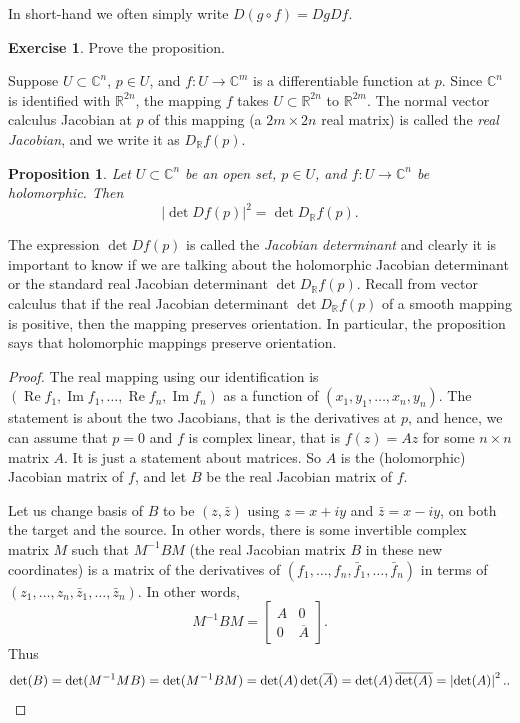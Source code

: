 \documentclass[12pt,openany]{book}
\renewcommand{\Re}{\operatorname{Re}}
\renewcommand{\Im}{\operatorname{Im}}
\newcommand{\abs}[1]{\left\lvert {#1} \right\rvert}
\newcommand{\C}{{\mathbb{C}}}
\newcommand{\R}{{\mathbb{R}}}
\newcommand{\myindex}[1]{#1\index{#1}}
\theoremstyle{plain}
\newtheorem{prop}[thm]{Proposition}
\theoremstyle{remark}
\theoremstyle{definition}
\newenvironment{exbox}{%
    \def\FrameCommand{\vrule width 1pt \relax\hspace {10pt}}%
    \MakeFramed {\advance \hsize -\width \FrameRestore }%
}{%
    \endMakeFramed
}
\theoremstyle{exercise}
\newtheorem{exercise}{Exercise}[section]
\theoremstyle{example}
\begin{document}
In short-hand we often simply write $D(g \circ f) = Dg Df$.

\begin{exbox}
\begin{exercise}
Prove the proposition.
\end{exercise}
\end{exbox}

Suppose $U \subset \C^n$, $p \in U$, and $f \colon U \to \C^m$
is a differentiable function at $p$.
Since $\C^n$ is identified with $\R^{2n}$, the mapping $f$
takes $U \subset \R^{2n}$ to $\R^{2m}$.  The normal vector calculus Jacobian at $p$
of this mapping (a $2m \times 2n$ real matrix) is called the
\emph{\myindex{real Jacobian}}, and we write it as
%
$D_\R f (p)$.

\begin{prop}
Let $U \subset \C^n$ be an open set, $p \in U$, and 
$f \colon U \to \C^n$ be holomorphic.  Then
\begin{equation*}
\abs{\det D f(p) }^2 = 
\det D_\R f(p) .
\end{equation*}
\end{prop}

The expression $\det D f(p)$ is called the \emph{\myindex{Jacobian
determinant}} and clearly it is important to know if we are talking about
the holomorphic Jacobian determinant or the standard real Jacobian
determinant $\det D_\R f(p)$.  Recall from vector calculus that
if the real Jacobian determinant $\det D_\R
f(p)$ of a smooth mapping is positive, then the mapping preserves
orientation.  In particular, the proposition
says that holomorphic mappings preserve orientation.

\begin{proof}
The real mapping using our identification is
$(\Re f_1,\Im f_1, \ldots, \Re f_n, \Im f_n)$
as a function of $(x_1,y_1,\ldots,x_n,y_n)$.
The statement is about the two Jacobians, that is the derivatives
at $p$, and hence, we can assume that
$p=0$ and $f$ is complex linear, that is $f(z) = Az$ for some $n \times n$
matrix $A$.  It is just a statement about matrices.
So $A$ is the (holomorphic) Jacobian matrix of $f$, and
let $B$ be the real Jacobian matrix of $f$.

Let us change basis of $B$ to be $(z,\bar{z})$
using $z = x+iy$ and $\bar{z}=x-iy$,
on both the target and the source.
In other words, there is some invertible
complex matrix $M$ such that
$M^{-1} B M$ (the real Jacobian matrix $B$ in these new coordinates)
is a matrix 
of the derivatives of
$(f_1,\ldots,f_n,\bar{f}_1,\ldots,\bar{f}_n)$
in terms of
$(z_1,\ldots,z_n,\bar{z}_1,\ldots,\bar{z}_n)$.
In other words,
\begin{equation*}
M^{-1} B M =
\begin{bmatrix}
A & 0 \\
0 & \overline{A}
\end{bmatrix} .
\end{equation*}
Thus
\begin{equation*}
\det (B) =
\det(M^{-1}M B)
=
\det(M^{-1} B M)
=
\det(A) \det(\overline{A})
=
\det(A) \, \overline{\det(A)}
=
\abs{\det(A)}^2 .  \qedhere.
\end{equation*}
\end{proof}
\end{document}
